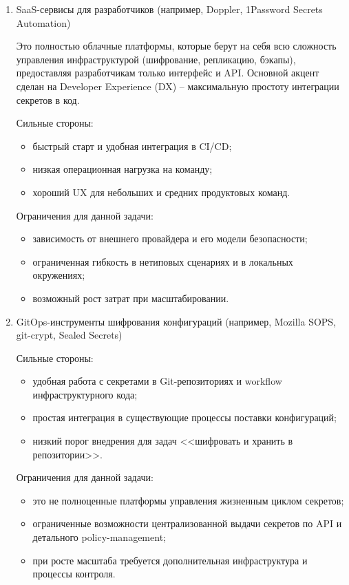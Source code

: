 \documentclass[14pt, a4paper]{extarticle}
\begin{document}
\begin{enumerate}
	\item SaaS-сервисы для разработчиков (например, Doppler, 1Password Secrets Automation)
	
	Это полностью облачные платформы, которые берут на себя всю сложность управления инфраструктурой (шифрование, репликацию, бэкапы), предоставляя разработчикам только интерфейс и API. Основной акцент сделан на Developer Experience (DX) -- максимальную простоту интеграции секретов в код.
	
	Сильные стороны:
	
	\begin{itemize}
	\item быстрый старт и удобная интеграция в CI/CD;
	\item низкая операционная нагрузка на команду;
	\item хороший UX для небольших и средних продуктовых команд.
	\end{itemize}
	
	Ограничения для данной задачи:
	
	\begin{itemize}
	\item зависимость от внешнего провайдера и его модели безопасности;
	\item ограниченная гибкость в нетиповых сценариях и в локальных окружениях;
	\item возможный рост затрат при масштабировании.
	\end{itemize}
	
	\item GitOps-инструменты шифрования конфигураций (например, Mozilla SOPS, git-crypt, Sealed Secrets)
	
	Сильные стороны:
	
	\begin{itemize}
	\item удобная работа с секретами в Git-репозиториях и workflow инфраструктурного кода;
	\item простая интеграция в существующие процессы поставки конфигураций;
	\item низкий порог внедрения для задач <<шифровать и хранить в репозитории>>.
	\end{itemize}
	
	Ограничения для данной задачи:
	
	\begin{itemize}
	\item это не полноценные платформы управления жизненным циклом секретов;
	\item ограниченные возможности централизованной выдачи секретов по API и детального policy-management;
	\item при росте масштаба требуется дополнительная инфраструктура и процессы контроля.
	\end{itemize}
	
	\end{enumerate}
		
\end{document}
